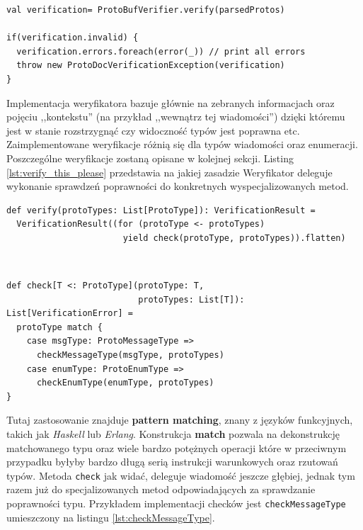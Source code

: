\documentclass[pdflatex,11pt]{aghdpl}
\begin{document}
\begin{lstlisting}[caption={Przykład wykorzystania weryfikatora}, label={lst:verify_how_it_is_called}]
val verification= ProtoBufVerifier.verify(parsedProtos)

if(verification.invalid) {
  verification.errors.foreach(error(_)) // print all errors
  throw new ProtoDocVerificationException(verification)
}
\end{lstlisting}


Implementacja weryfikatora bazuje głównie na zebranych informacjach oraz pojęciu ,,kontekstu'' (na przykład ,,wewnątrz tej wiadomości'')
dzięki któremu jest w stanie rozstrzygnąć czy widoczność typów jest poprawna etc. Zaimplementowane weryfikacje różnią się dla typów wiadomości 
oraz enumeracji. Poszczególne weryfikacje zostaną opisane w kolejnej sekcji. Listing \ref{lst:verify_this_please} przedstawia na jakiej zasadzie
Weryfikator deleguje wykonanie sprawdzeń poprawności do konkretnych wyspecjalizowanych metod.

\begin{lstlisting}[caption={Delegacja sprawdzania poprawności typów},label={lst:verify_this_please}]
def verify(protoTypes: List[ProtoType]): VerificationResult = 
  VerificationResult((for (protoType <- protoTypes) 
                       yield check(protoType, protoTypes)).flatten)
\end{lstlisting}

~

\begin{lstlisting}
def check[T <: ProtoType](protoType: T, 
                          protoTypes: List[T]): List[VerificationError] = 
  protoType match {
    case msgType: ProtoMessageType =>
      checkMessageType(msgType, protoTypes)
    case enumType: ProtoEnumType =>
      checkEnumType(enumType, protoTypes)
}
\end{lstlisting}

Tutaj zastosowanie znajduje \textbf{pattern matching}, znany z języków funkcyjnych, takich jak \textit{Haskell} lub \textit{Erlang}.
Konstrukcja \textbf{match} pozwala na dekonstrukcję matchowanego typu oraz wiele bardzo potężnych operacji które w przeciwnym przypadku 
byłyby bardzo długą serią instrukcji warunkowych oraz rzutowań typów. Metoda \verb|check| jak widać, deleguje wiadomość jeszcze głębiej, 
jednak tym razem już do specjalizowanych metod odpowiadających za sprawdzanie poprawności typu. Przykładem implementacji checków jest 
\verb|checkMessageType| umieszczony na listingu \ref{lst:checkMessageType}.
\end{document}
